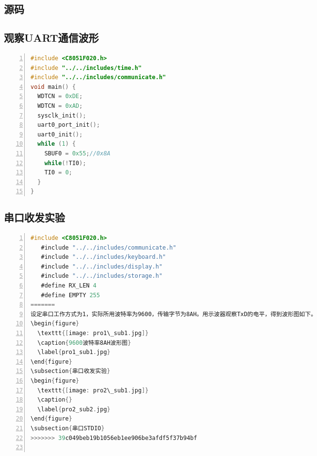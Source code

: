 \documentclass{article}
\begin{document}
\begin{CJK}{UTF8}{gkai}
\section{源码}
\subsection{观察UART通信波形}
\begin{lstlisting}[language=C,numbers=left,numberstyle=\tiny,%frame=shadowbox,
   rulesepcolor=\color{red!20!green!20!blue!20},
   keywordstyle=\color{blue!70!black},
   commentstyle=\color{blue!90!},
   basicstyle=\ttfamily]
#include <C8051F020.h>
#include "../../includes/time.h"
#include "../../includes/communicate.h"
void main() {
  WDTCN = 0xDE;
  WDTCN = 0xAD;
  sysclk_init();
  uart0_port_init();
  uart0_init();
  while (1) {
    SBUF0 = 0x55;//0x8A
    while(!TI0);
    TI0 = 0;
  }
}

\end{lstlisting}

\subsection{串口收发实验}
\begin{lstlisting}[language=C,numbers=left,numberstyle=\tiny,%frame=shadowbox,
   rulesepcolor=\color{red!20!green!20!blue!20},
   keywordstyle=\color{blue!70!black},
   commentstyle=\color{blue!90!},
   basicstyle=\ttfamily]
   #include <C8051F020.h>
   #include "../../includes/communicate.h"
   #include "../../includes/keyboard.h"
   #include "../../includes/display.h"
   #include "../../includes/storage.h"
   #define RX_LEN 4
   #define EMPTY 255
=======
设定串口工作方式为1，实际所用波特率为9600，传输字节为8AH。用示波器观察TxD的电平，得到波形图如下。
\begin{figure}
  \texttt{[image: pro1\_sub1.jpg]}
  \caption{9600波特率8AH波形图}
  \label{pro1_sub1.jpg}
\end{figure}
\subsection{串口收发实验}
\begin{figure}
  \texttt{[image: pro2\_sub1.jpg]}
  \caption{}
  \label{pro2_sub2.jpg}
\end{figure}
\subsection{串口STDIO}
>>>>>>> 39c049beb19b1056eb1ee906be3afdf5f37b94bf


\end{lstlisting}
\end{CJK}
\end{document}
